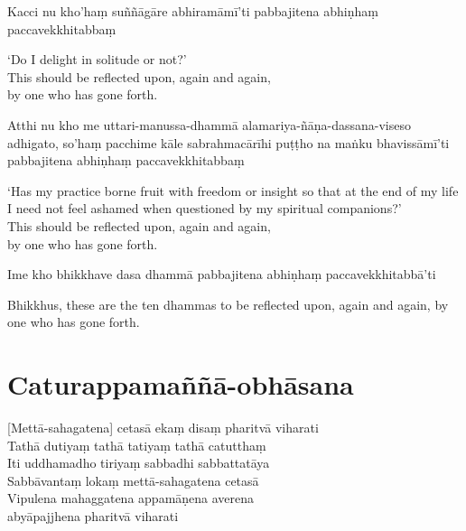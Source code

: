Kacci nu kho'haṃ suññāgāre abhiramāmī'ti pabbajitena abhiṇhaṃ paccavekkhitabbaṃ

\begin{english}
  `Do I delight in solitude or not?'\\
  This should be reflected upon, again and again,\\
  by one who has gone forth.
\end{english}

Atthi nu kho me uttari-manussa-dhammā alamariya-ñāṇa-dassana-viseso adhigato, so'haṃ pacchime kāle sabrahmacārīhi puṭṭho na maṅku bhavissāmī'ti pabbajitena abhiṇhaṃ paccavekkhitabbaṃ

\begin{english}
  `Has my practice borne fruit with freedom or insight so that at the end of my life I need not feel ashamed when questioned by my spiritual companions?'\\
  This should be reflected upon, again and again,\\
  by one who has gone forth.
\end{english}

Ime kho bhikkhave dasa dhammā pabbajitena abhiṇhaṃ paccavekkhitabbā'ti

\begin{english}
  Bhikkhus, these are the ten dhammas to be reflected upon, again and again, by one who has gone forth.
\end{english}


\section{Caturappamaññā-obhāsana}


\begin{leader}
\end{leader}

[Mettā-sahagatena] cetasā ekaṃ disaṃ pharitvā viharati\\
Tathā dutiyaṃ tathā tatiyaṃ tathā catutthaṃ\\
Iti uddhamadho tiriyaṃ sabbadhi sabbattatāya\\
Sabbāvantaṃ lokaṃ mettā-sahagatena cetasā\\
Vipulena mahaggatena appamāṇena averena\\
abyāpajjhena pharitvā viharati

